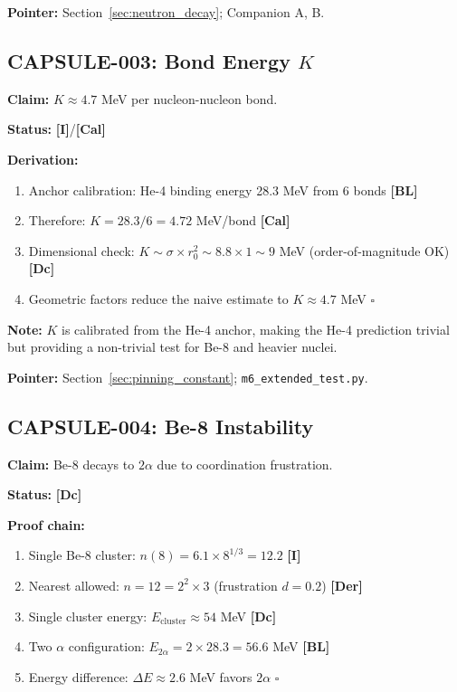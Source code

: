 \documentclass[11pt,a4paper]{article}
\newcommand{\tagI}{\textcolor{orange!80!black}{\textbf{[I]}}}
\newcommand{\tagDc}{\textcolor{blue!70!black}{\textbf{[Dc]}}}
\newcommand{\tagDer}{\textcolor{green!50!black}{\textbf{[Der]}}}
\newcommand{\tagCal}{\textcolor{purple!70!black}{\textbf{[Cal]}}}
\newcommand{\tagBL}{\textcolor{gray!70!black}{\textbf{[BL]}}}
\begin{document}
\textbf{Pointer:} Section~\ref{sec:neutron_decay}; Companion A, B.

\subsection{CAPSULE-003: Bond Energy $K$}

\textbf{Claim:} $K \approx 4.7$ MeV per nucleon-nucleon bond.

\textbf{Status:} \tagI{}/\tagCal{}

\textbf{Derivation:}
\begin{enumerate}
    \item Anchor calibration: He-4 binding energy 28.3 MeV from 6 bonds \tagBL{}
    \item Therefore: $K = 28.3/6 = 4.72$ MeV/bond \tagCal{}
    \item Dimensional check: $K \sim \sigma \times r_0^2 \sim 8.8 \times 1 \sim 9$ MeV (order-of-magnitude OK) \tagDc{}
    \item Geometric factors reduce the naive estimate to $K \approx 4.7$ MeV \quad $\square$
\end{enumerate}

\textbf{Note:} $K$ is calibrated from the He-4 anchor, making the He-4 prediction trivial but providing a non-trivial test for Be-8 and heavier nuclei.

\textbf{Pointer:} Section~\ref{sec:pinning_constant}; \texttt{m6\_extended\_test.py}.

\subsection{CAPSULE-004: Be-8 Instability}

\textbf{Claim:} Be-8 decays to $2\alpha$ due to coordination frustration.

\textbf{Status:} \tagDc{}

\textbf{Proof chain:}
\begin{enumerate}
    \item Single Be-8 cluster: $n(8) = 6.1 \times 8^{1/3} = 12.2$ \tagI{}
    \item Nearest allowed: $n = 12 = 2^2 \times 3$ (frustration $d = 0.2$) \tagDer{}
    \item Single cluster energy: $E_{\text{cluster}} \approx 54$ MeV \tagDc{}
    \item Two $\alpha$ configuration: $E_{2\alpha} = 2 \times 28.3 = 56.6$ MeV \tagBL{}
    \item Energy difference: $\Delta E \approx 2.6$ MeV favors $2\alpha$ \quad $\square$
\end{enumerate}
\end{document}
